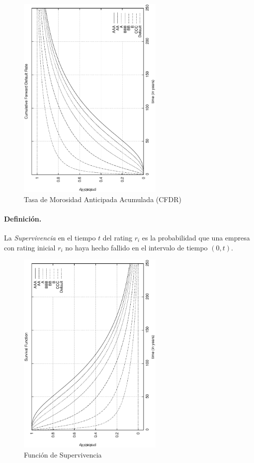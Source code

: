 \begin{figure}[!hb]
\begin{center}
\includegraphics[height=10cm, angle=-90]{./images/tmaa.ps}
\caption{Tasa de Morosidad Anticipada Acumulada (CFDR)}
\label{cfdr}
\end{center}
\end{figure}

\paragraph{Definici\'on.} La \emph{Supervivencia} en el
tiempo $t$ del rating $r_i$ es la probabilidad que una empresa con rating inicial
$r_i$ no haya hecho fallido en el intervalo de tiempo $(0,t)$.

\begin{figure}[!hb]
\begin{center}
\includegraphics[height=10cm, angle=-90]{./images/survival.ps}
\caption{Funci\'on de Supervivencia}
\label{survival}
\end{center}
\end{figure}

